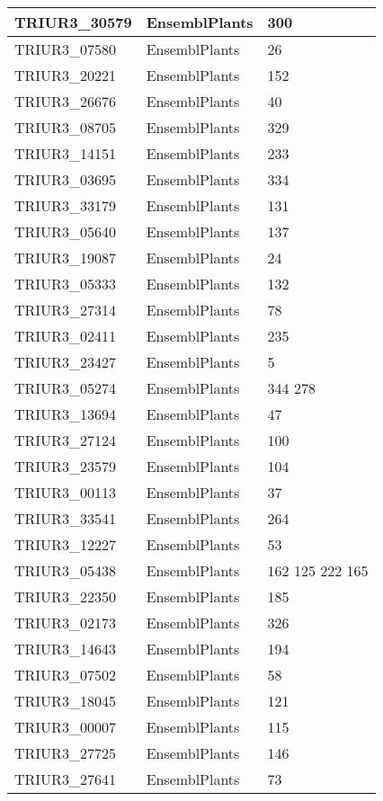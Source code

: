 {\begin{longtable}{|p{5cm}|p{5cm}|p{5cm}|}
\hline
TRIUR3\_30579 & EnsemblPlants  & 300 \\
\hline
TRIUR3\_07580 & EnsemblPlants  & 26 \\
\hline
TRIUR3\_20221 & EnsemblPlants  & 152 \\
\hline
TRIUR3\_26676 & EnsemblPlants  & 40 \\
\hline
TRIUR3\_08705 & EnsemblPlants  & 329 \\
\hline
TRIUR3\_14151 & EnsemblPlants  & 233 \\
\hline
TRIUR3\_03695 & EnsemblPlants  & 334 \\
\hline
TRIUR3\_33179 & EnsemblPlants  & 131 \\
\hline
TRIUR3\_05640 & EnsemblPlants  & 137 \\
\hline
TRIUR3\_19087 & EnsemblPlants  & 24 \\
\hline
TRIUR3\_05333 & EnsemblPlants  & 132 \\
\hline
TRIUR3\_27314 & EnsemblPlants  & 78 \\
\hline
TRIUR3\_02411 & EnsemblPlants  & 235 \\
\hline
TRIUR3\_23427 & EnsemblPlants  & 5 \\
\hline
TRIUR3\_05274 & EnsemblPlants  & 344 278 \\
\hline
TRIUR3\_13694 & EnsemblPlants  & 47 \\
\hline
TRIUR3\_27124 & EnsemblPlants  & 100 \\
\hline
TRIUR3\_23579 & EnsemblPlants  & 104 \\
\hline
TRIUR3\_00113 & EnsemblPlants  & 37 \\
\hline
TRIUR3\_33541 & EnsemblPlants  & 264 \\
\hline
TRIUR3\_12227 & EnsemblPlants  & 53 \\
\hline
TRIUR3\_05438 & EnsemblPlants  & 162 125 222 165 \\
\hline
TRIUR3\_22350 & EnsemblPlants  & 185 \\
\hline
TRIUR3\_02173 & EnsemblPlants  & 326 \\
\hline
TRIUR3\_14643 & EnsemblPlants  & 194 \\
\hline
TRIUR3\_07502 & EnsemblPlants  & 58 \\
\hline
TRIUR3\_18045 & EnsemblPlants  & 121 \\
\hline
TRIUR3\_00007 & EnsemblPlants  & 115 \\
\hline
TRIUR3\_27725 & EnsemblPlants  & 146 \\
\hline
TRIUR3\_27641 & EnsemblPlants  & 73 \\

\end{longtable}}
